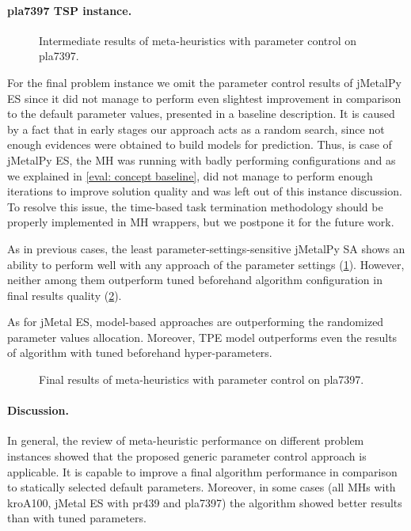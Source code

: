 \newpage
\paragraph{pla7397 TSP instance.}
\begin{figure}[t]
	\centering
	
	\caption{Intermediate results of meta-heuristics with parameter control on pla7397.}
	\label{eval:pict:pc:pla7397 intermediate}
\end{figure}

For the final problem instance we omit the parameter control results of jMetalPy ES since it did not manage to perform even slightest improvement in comparison to the default parameter values, presented in a baseline description. It is caused by a fact that in early stages our approach acts as a random search, since not enough evidences were obtained to build models for prediction. Thus, is case of jMetalPy ES, the MH was running with badly performing configurations and as we explained in \cref{eval: concept baseline}, did not manage to perform enough iterations to improve solution quality and was left out of this instance discussion. To resolve this issue, the time-based task termination methodology should be properly implemented in MH wrappers, but we postpone it for the future work.

As in previous cases, the least parameter-settings-sensitive jMetalPy SA shows an ability to perform well with any approach of the parameter settings (\cref{eval:pict:pc:pla7397 intermediate}). However, neither among them outperform tuned beforehand algorithm configuration in final results quality (\cref{eval:pict:pc:pla7397 final}).

As for jMetal ES, model-based approaches are outperforming the randomized parameter values allocation. Moreover, TPE model outperforms even the results of algorithm with tuned beforehand hyper-parameters.

\begin{figure}[b]
	\centering
	
	\caption{Final results of meta-heuristics with parameter control on pla7397.}
	\label{eval:pict:pc:pla7397 final}
\end{figure}

\newpage
\paragraph{Discussion.} In general, the review of meta-heuristic performance on different problem instances showed that the proposed generic parameter control approach is applicable. It is capable to improve a final algorithm performance in comparison to statically selected default parameters. Moreover, in some cases (all MHs with kroA100, jMetal ES with pr439 and pla7397) the algorithm showed better results than with tuned parameters.

